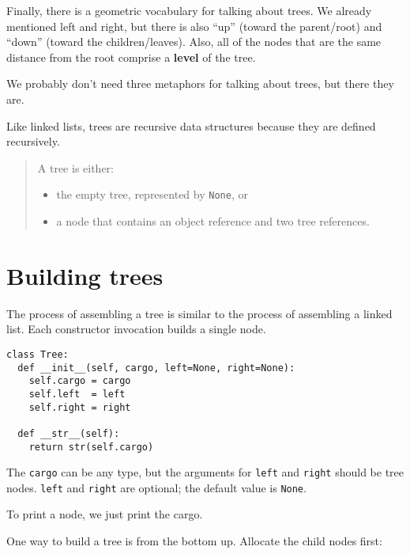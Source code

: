 Finally, there is a geometric vocabulary for talking
about trees.  We already mentioned left and right, but there is
also ``up'' (toward the parent/root) and ``down'' (toward the
children/leaves).  Also, all of the nodes that are the same
distance from the root comprise a {\bf level} of the tree.

We probably don't need three metaphors for talking about trees,
but there they are.

Like linked lists, trees are recursive data structures because
they are defined recursively.


\begin{quote}
A tree is either:

\begin{itemize}

\item the empty tree, represented by {\tt None}, or

\item a node that contains an object reference and two
tree references.

\end{itemize}

\end{quote}



\section {Building trees}

The process of assembling a tree is similar
to the process of assembling a linked list.
Each constructor invocation builds a single node.

\beforeverb
\begin{verbatim}
class Tree:
  def __init__(self, cargo, left=None, right=None):
    self.cargo = cargo
    self.left  = left
    self.right = right

  def __str__(self):
    return str(self.cargo)
\end{verbatim}
\afterverb
%
The {\tt cargo} can
be any type, but the arguments for {\tt left} and {\tt right} should be
tree nodes.  {\tt left} and {\tt right} are optional; the default
value is {\tt None}.

To print a node, we just print the cargo.

One way to build a tree is from the bottom up.
Allocate the child nodes first:

